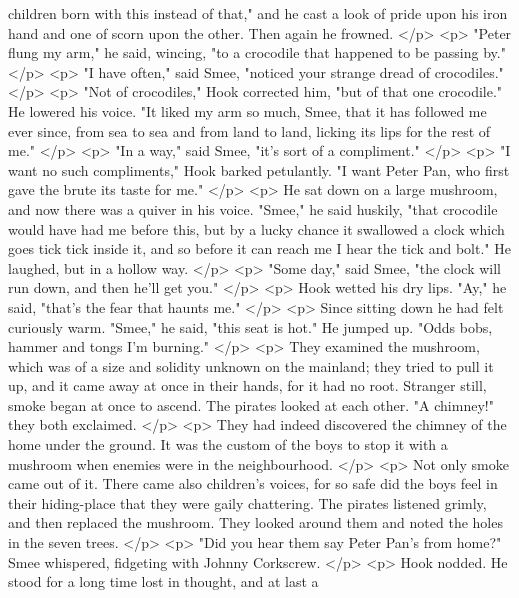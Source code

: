       children born with this instead of that," and he cast a look of pride upon
      his iron hand and one of scorn upon the other. Then again he frowned.
    </p>
    <p>
      "Peter flung my arm," he said, wincing, "to a crocodile that happened to
      be passing by."
    </p>
    <p>
      "I have often," said Smee, "noticed your strange dread of crocodiles."
    </p>
    <p>
      "Not of crocodiles," Hook corrected him, "but of that one crocodile." He
      lowered his voice. "It liked my arm so much, Smee, that it has followed me
      ever since, from sea to sea and from land to land, licking its lips for
      the rest of me."
    </p>
    <p>
      "In a way," said Smee, "it's sort of a compliment."
    </p>
    <p>
      "I want no such compliments," Hook barked petulantly. "I want Peter Pan,
      who first gave the brute its taste for me."
    </p>
    <p>
      He sat down on a large mushroom, and now there was a quiver in his voice.
      "Smee," he said huskily, "that crocodile would have had me before this,
      but by a lucky chance it swallowed a clock which goes tick tick inside it,
      and so before it can reach me I hear the tick and bolt." He laughed, but
      in a hollow way.
    </p>
    <p>
      "Some day," said Smee, "the clock will run down, and then he'll get you."
    </p>
    <p>
      Hook wetted his dry lips. "Ay," he said, "that's the fear that haunts me."
    </p>
    <p>
      Since sitting down he had felt curiously warm. "Smee," he said, "this seat
      is hot." He jumped up. "Odds bobs, hammer and tongs I'm burning."
    </p>
    <p>
      They examined the mushroom, which was of a size and solidity unknown on
      the mainland; they tried to pull it up, and it came away at once in their
      hands, for it had no root. Stranger still, smoke began at once to ascend.
      The pirates looked at each other. "A chimney!" they both exclaimed.
    </p>
    <p>
      They had indeed discovered the chimney of the home under the ground. It
      was the custom of the boys to stop it with a mushroom when enemies were in
      the neighbourhood.
    </p>
    <p>
      Not only smoke came out of it. There came also children's voices, for so
      safe did the boys feel in their hiding-place that they were gaily
      chattering. The pirates listened grimly, and then replaced the mushroom.
      They looked around them and noted the holes in the seven trees.
    </p>
    <p>
      "Did you hear them say Peter Pan's from home?" Smee whispered, fidgeting
      with Johnny Corkscrew.
    </p>
    <p>
      Hook nodded. He stood for a long time lost in thought, and at last a
